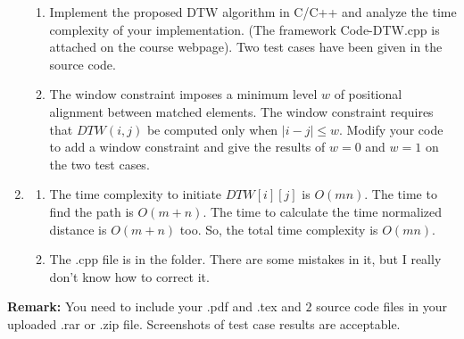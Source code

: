 \documentclass[12pt,a4paper]{article}
\makeatletter
\newtheorem*{solution}{Solution}
\theoremstyle{definition}
\renewenvironment{solution}[1][Solution] {\par\pushQED{\qed}\normalfont\topsep6\p@\@plus6\p@\relax\trivlist\item[\hskip\labelsep\bfseries#1\@addpunct{.}]\ignorespaces}{\popQED\endtrivlist\@endpefalse} \makeatother
\makeatother
\begin{document}
\begin{enumerate}
		\begin{enumerate}
			\item Implement the proposed DTW algorithm in C/C++ and analyze the time complexity of your implementation. ({\color{blue}The framework Code-DTW.cpp is attached on the course webpage}). Two test cases have been given in the source code. 
			\item The window constraint imposes a minimum level $w$ of positional alignment between matched elements. The window constraint requires that $DTW(i, j)$ be computed only when $|i-j| \leq w$. Modify your code to add a window constraint and give the results of $ w=0 $ and $ w=1 $ on the two test cases. 
		\end{enumerate}
		    \begin{solution}
		        \begin{enumerate}
					\item The time complexity to initiate $DTW[i][j]$ is $O(mn)$. The time to find the path is $O(m+n)$. The time to calculate the time normalized distance is $O(m+n)$ too. So, the total time complexity is $O(mn)$.
					\item The .cpp file is in the folder. There are some mistakes in it, but I really don't know how to correct it.
				\end{enumerate}
		    \end{solution}
		
	\end{enumerate}
	
	\vspace{20pt}
	
	\textbf{Remark:} You need to include your .pdf and .tex and {\color{red}\emph{$2$}} source code files in your uploaded .rar or .zip file. Screenshots of test case results are acceptable.
	
\end{document}
